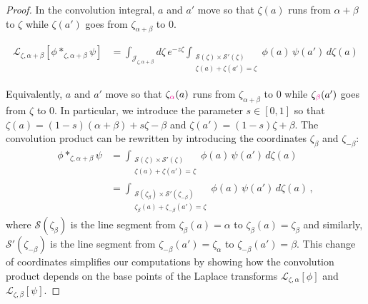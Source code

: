 \documentclass{article}
\newcommand{\laplace}{\mathcal{L}}
\theoremstyle{definition}
\theoremstyle{plain}
\newenvironment{revised}{\color{DarkBlue}}{\color{black}}
\newenvironment{revised}{}{}
\begin{document}
\begin{proof}
\color{violet}
In the convolution integral, $a$ and $a'$ move so that $\zeta(a)$ runs from $\alpha+\beta$ to $\zeta$ while $\zeta(a')$ goes from $\zeta_{\alpha+\beta}$ to $0$.


\begin{align*}
\laplace_{\zeta,\alpha+\beta}[{\phi}\ast_{\zeta, \alpha+\beta}{\psi}]&=\int_{\mathcal{J}_{\zeta,\alpha+\beta}}d\zeta\,e^{-z\zeta}\int_{\substack{\mathcal{S}(\zeta) \times \mathcal{S}'(\zeta) \\ \zeta(a) + \zeta(a') = \zeta}}  \phi(a)\, \psi(a')\, d\zeta(a)
\end{align*}

Equivalently, $a$ and $a'$ move so that $\zeta_{\textcolor{magenta}{\alpha}}(a)$ runs from $\zeta_{\alpha+\beta}$ to $0$ while $\zeta_{\textcolor{magenta}{\beta}}(a')$ goes from $\zeta$ to $0$. In particular, we introduce the parameter $s\in [0,1]$ so that $\zeta(a)=(1-s)(\alpha+\beta)+s\zeta-\beta$ and $\zeta(a')=(1-s)\zeta+\beta$. 
\color{black}
\begin{revised}
The convolution product can be rewritten by introducing the coordinates $\zeta_\beta$ and $\zeta_{-\beta}$:
\begin{align*}
\phi \ast_{\zeta, \alpha+\beta} \psi &= \int_{\substack{\mathcal{S}(\zeta) \times \mathcal{S}'(\zeta) \\ \zeta(a) + \zeta(a') = \zeta}} \phi(a)\,\psi(a')\,d\zeta(a)\\
&=\int_{\substack{\mathcal{S}(\zeta_{\beta}) \times \mathcal{S}'(\zeta_{-\beta}) \\ \zeta_{\beta}(a) + \zeta_{-\beta}(a') = \zeta}} \phi(a)\,\psi(a')\,d\zeta(a)\,,
\end{align*}
where $\mathcal{S}(\zeta_{\beta})$ is the line segment from $\zeta_\beta(a)=\alpha$ to $\zeta_\beta(a)=\zeta_\beta$ and similarly, $\mathcal{S}'(\zeta_{-\beta})$ is the line segment from $\zeta_{-\beta}(a')=\zeta_\alpha$ to $\zeta_{-\beta}(a')=\beta$. This change of coordinates simplifies our computations by showing how the convolution product depends on the base points of the Laplace transforms $\laplace_{\zeta,\alpha}[\phi]$ and $\laplace_{\zeta,\beta}[\psi]$.  


\end{revised}
\end{proof}
\end{document}
